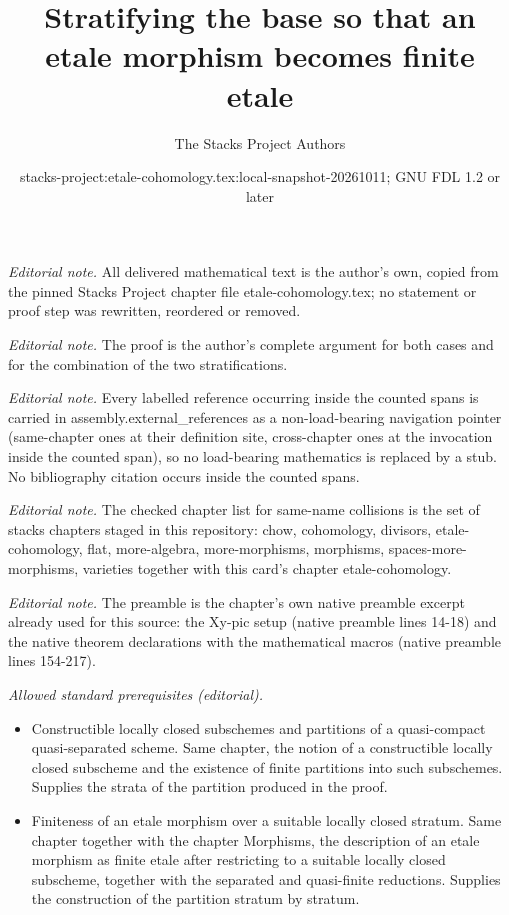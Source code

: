 \documentclass[10pt,a4paper]{amsart}
\title{Stratifying the base so that an etale morphism becomes finite etale}
\author{The Stacks Project Authors}
\date{stacks-project:etale-cohomology.tex:local-snapshot-20261011; GNU FDL 1.2 or later}
\theoremstyle{plain}
\theoremstyle{definition}
\theoremstyle{remark}
\numberwithin{equation}{subsection}
\begin{document}
\maketitle
\noindent\textit{Editorial note.} All delivered mathematical text is the author's own, copied from the pinned Stacks Project chapter file etale-cohomology.tex; no statement or proof step was rewritten, reordered or removed.\par\medskip
\noindent\textit{Editorial note.} The proof is the author's complete argument for both cases and for the combination of the two stratifications.\par\medskip
\noindent\textit{Editorial note.} Every labelled reference occurring inside the counted spans is carried in assembly.external\_references as a non-load-bearing navigation pointer (same-chapter ones at their definition site, cross-chapter ones at the invocation inside the counted span), so no load-bearing mathematics is replaced by a stub. No bibliography citation occurs inside the counted spans.\par\medskip
\noindent\textit{Editorial note.} The checked chapter list for same-name collisions is the set of stacks chapters staged in this repository: chow, cohomology, divisors, etale-cohomology, flat, more-algebra, more-morphisms, morphisms, spaces-more-morphisms, varieties together with this card's chapter etale-cohomology.\par\medskip
\noindent\textit{Editorial note.} The preamble is the chapter's own native preamble excerpt already used for this source: the Xy-pic setup (native preamble lines 14-18) and the native theorem declarations with the mathematical macros (native preamble lines 154-217).\par\medskip
\noindent\textit{Allowed standard prerequisites (editorial).}\begin{itemize}
\item Constructible locally closed subschemes and partitions of a quasi-compact quasi-separated scheme. Same chapter, the notion of a constructible locally closed subscheme and the existence of finite partitions into such subschemes. Supplies the strata of the partition produced in the proof.
\item Finiteness of an etale morphism over a suitable locally closed stratum. Same chapter together with the chapter Morphisms, the description of an etale morphism as finite etale after restricting to a suitable locally closed subscheme, together with the separated and quasi-finite reductions. Supplies the construction of the partition stratum by stratum.
\end{itemize}\medskip
\end{document}
